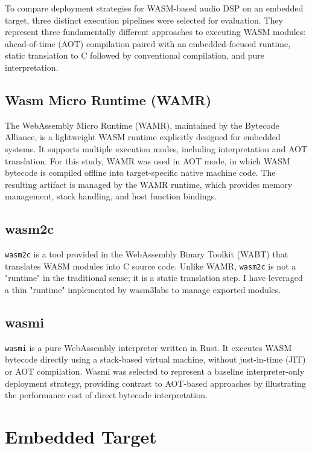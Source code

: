 To compare deployment strategies for WASM-based audio DSP on an embedded target, three distinct execution pipelines were selected for evaluation. They represent three fundamentally different approaches to executing WASM modules: ahead-of-time (AOT) compilation paired with an embedded-focused runtime, static translation to C followed by conventional compilation, and pure interpretation.

\subsection{ Wasm Micro Runtime (WAMR) }

The WebAssembly Micro Runtime (WAMR), maintained by the Bytecode Alliance\cite{bytecode_alliance}, is a lightweight WASM runtime explicitly designed for embedded systems. It supports multiple execution modes, including interpretation and AOT translation. For this study, WAMR was used in AOT mode, in which WASM bytecode is compiled offline into target-specific native machine code. The resulting artifact is managed by the WAMR runtime, which provides memory management, stack handling, and host function bindings.

\subsection{ wasm2c }

\lstinline{wasm2c} is a tool provided in the WebAssembly Binary Toolkit (WABT)\cite{wabt-repo} that translates WASM modules into C source code. Unlike WAMR, \lstinline{wasm2c} is not a "runtime" in the traditional sense; it is a static translation step. I have leveraged a thin "runtime" implemented by wasm3labs\cite{embedded-wasm-apps_repo} to manage exported modules.


\subsection{ wasmi }

\lstinline{wasmi}\cite{wasmi} is a pure WebAssembly interpreter written in Rust. It executes WASM bytecode directly using a stack-based virtual machine, without just-in-time (JIT) or AOT compilation. Wasmi was selected to represent a baseline interpreter-only deployment strategy, providing contrast to AOT-based approaches by illustrating the performance cost of direct bytecode interpretation.

\section { Embedded Target }

